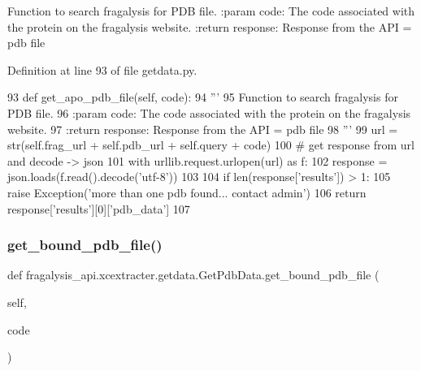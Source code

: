 \begin{DoxyVerb}Function to search fragalysis for PDB file.
:param code: The code associated with the protein on the fragalysis website.
:return response: Response from the API = pdb file
\end{DoxyVerb}
 

Definition at line 93 of file getdata.\+py.


\begin{DoxyCode}
93     \textcolor{keyword}{def }get\_apo\_pdb\_file(self, code):
94         \textcolor{stringliteral}{'''}
95 \textcolor{stringliteral}{        Function to search fragalysis for PDB file.}
96 \textcolor{stringliteral}{        :param code: The code associated with the protein on the fragalysis website.}
97 \textcolor{stringliteral}{        :return response: Response from the API = pdb file}
98 \textcolor{stringliteral}{        '''}
99         url = str(self.frag\_url + self.pdb\_url + self.query + code)
100         \textcolor{comment}{# get response from url and decode -> json}
101         with urllib.request.urlopen(url) \textcolor{keyword}{as} f:
102             response = json.loads(f.read().decode(\textcolor{stringliteral}{'utf-8'}))
103 
104         \textcolor{keywordflow}{if} len(response[\textcolor{stringliteral}{'results'}]) > 1:
105             \textcolor{keywordflow}{raise} Exception(\textcolor{stringliteral}{'more than one pdb found... contact admin'})
106         \textcolor{keywordflow}{return} response[\textcolor{stringliteral}{'results'}][0][\textcolor{stringliteral}{'pdb\_data'}]
107 
\end{DoxyCode}
\mbox{\label{classfragalysis__api_1_1xcextracter_1_1getdata_1_1_get_pdb_data_afcb12b3a8f39a7d54917eefed0a1b4af}} 
\subsubsection{\texorpdfstring{get\+\_\+bound\+\_\+pdb\+\_\+file()}{get\_bound\_pdb\_file()}}
{\footnotesize\ttfamily def fragalysis\+\_\+api.\+xcextracter.\+getdata.\+Get\+Pdb\+Data.\+get\+\_\+bound\+\_\+pdb\+\_\+file (\begin{DoxyParamCaption}\item[{}]{self,  }\item[{}]{code }\end{DoxyParamCaption})}

